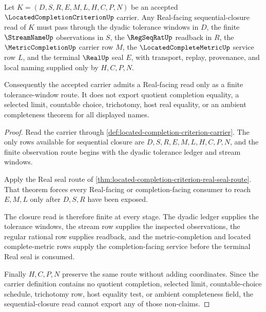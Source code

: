 \begin{theorem}
\label{thm:located-completion-criterion-sequential-closure}
Let $K=(D,S,R,E,M,L,H,C,P,N)$ be an accepted $\LocatedCompletionCriterionUp$ carrier. Any Real-facing sequential-closure read of $K$ must pass through the dyadic tolerance windows in $D$, the finite $\StreamNameUp$ observations in $S$, the $\RegSeqRatUp$ readback in $R$, the $\MetricCompletionUp$ carrier row $M$, the $\LocatedCompleteMetricUp$ service row $L$, and the terminal $\RealUp$ seal $E$, with transport, replay, provenance, and local naming supplied only by $H,C,P,N$.

Consequently the accepted carrier admits a Real-facing read only as a finite tolerance-window route. It does not export quotient completion equality, a selected limit, countable choice, trichotomy, host real equality, or an ambient completeness theorem for all displayed names.
\end{theorem}
\begin{proof}
Read the carrier through \autoref{def:located-completion-criterion-carrier}. The only rows available for sequential closure are $D,S,R,E,M,L,H,C,P,N$, and the finite observation route begins with the dyadic tolerance ledger and stream windows.

Apply the Real seal route of \autoref{thm:located-completion-criterion-real-seal-route}. That theorem forces every Real-facing or completion-facing consumer to reach $E,M,L$ only after $D,S,R$ have been exposed.

The closure read is therefore finite at every stage. The dyadic ledger supplies the tolerance windows, the stream row supplies the inspected observations, the regular rational row supplies readback, and the metric-completion and located complete-metric rows supply the completion-facing service before the terminal Real seal is consumed.

Finally $H,C,P,N$ preserve the same route without adding coordinates. Since the carrier definition contains no quotient completion, selected limit, countable-choice schedule, trichotomy row, host equality test, or ambient completeness field, the sequential-closure read cannot export any of those non-claims.
\end{proof}

